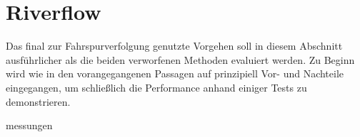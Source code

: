 \section{Riverflow \dcsecondauthorshort}
Das final zur Fahrspurverfolgung genutzte Vorgehen soll in diesem Abschnitt ausführlicher als die beiden verworfenen Methoden evaluiert werden. Zu Beginn wird wie in den vorangegangenen Passagen auf prinzipiell Vor- und Nachteile eingegangen, um schließlich die Performance anhand einiger Tests zu demonstrieren.


{messungen}